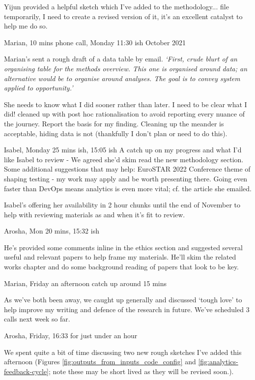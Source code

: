 Yijun provided a helpful sketch which I've added to the methodology... file temporarily, I need to create a revised version of it, it's an excellent catalyst to help me do so.

\dotfill
Marian, 10 mins phone call, Monday 11:30 ish  October 2021

Marian's sent a rough draft of a data table by email. 
\emph{`First, crude blurt of an organising table for the methods overview.  This one is organised around data;  an alternative would be to organise around analyses.  The goal is to convey system applied to opportunity.'}

She needs to know what I did sooner rather than later. I need to be clear what I did! cleaned up with post hoc rationalisation to avoid reporting every nuance of the journey. Report the basis for my finding. Cleaning up the meander is acceptable, hiding data is not (thankfully I don't plan or need to do this).

\dotfill
Isabel, Monday 25 mins ish, 15:05 ish
A catch up on my progress and what I'd like Isabel to review - We agreed she'd skim read the new methodology section. 
Some additional suggestions that may help: EuroSTAR 2022 Conference theme of shaping testing - my work may apply and be worth presenting there.
Going even faster than DevOps means analytics is even more vital; cf. the article she emailed. 

Isabel's offering her availability in 2 hour chunks until the end of November to help with reviewing materials as and when it's fit to review.

\dotfill
Arosha, Mon 20 mins, 15:32 ish

He's provided some comments inline in the ethics section and suggested several useful and relevant papers to help frame my materials. He'll skim the related works chapter and do some background reading of papers that look to be key.

\dotfill
Marian, Friday an afternoon catch up around 15 mins 

As we've both been away, we caught up generally and discussed `tough love' to help improve my writing and defence of the research in future. We've scheduled 3 calls next week so far.

\dotfill
Arosha, Friday, 16:33 for just under an hour

We spent quite a bit of time discussing two new rough sketches I've added this afternoon (Figures \ref{fig:outputs_from_inputs_code_config} and \ref{fig:analytics-feedback-cycle}; note these may be short lived as they will be revised soon.). 

